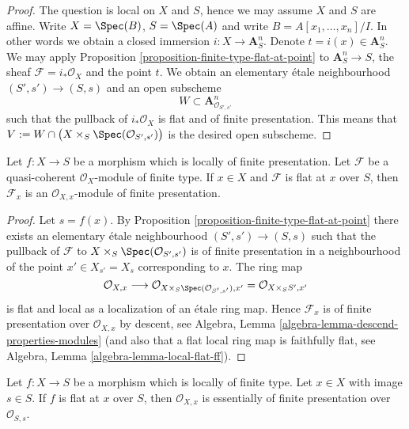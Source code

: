 \begin{proof}
The question is local on $X$ and $S$, hence we may assume $X$ and $S$
are affine. Write $X = \Spec(B)$, $S = \Spec(A)$ and write
$B = A[x_1, \ldots, x_n]/I$. In other words we obtain a closed immersion
$i : X \to \mathbf{A}^n_S$. Denote $t = i(x) \in \mathbf{A}^n_S$.
We may apply
Proposition \ref{proposition-finite-type-flat-at-point}
to $\mathbf{A}^n_S \to S$, the sheaf $\mathcal{F} = i_*\mathcal{O}_X$
and the point $t$. We obtain an elementary
\'etale neighbourhood $(S', s') \to (S, s)$ and an open subscheme
$$
W \subset \mathbf{A}^n_{\mathcal{O}_{S', s'}}
$$
such that the pullback of $i_*\mathcal{O}_X$ is flat and of finite
presentation. This means that
$V := W \cap \big(X \times_S \Spec(\mathcal{O}_{S', s'})\big)$
is the desired open subscheme.
\end{proof}

\begin{lemma}
\label{lemma-finite-type-flat-at-point-local}
Let $f : X \to S$ be a morphism which is locally of finite presentation.
Let $\mathcal{F}$ be a quasi-coherent $\mathcal{O}_X$-module of finite type.
If $x \in X$ and $\mathcal{F}$ is flat at $x$ over $S$, then
$\mathcal{F}_x$ is an $\mathcal{O}_{X, x}$-module of finite presentation.
\end{lemma}

\begin{proof}
Let $s = f(x)$. By
Proposition \ref{proposition-finite-type-flat-at-point}
there exists an elementary \'etale neighbourhood $(S', s') \to (S, s)$
such that the pullback of $\mathcal{F}$ to
$X \times_S \Spec(\mathcal{O}_{S', s'})$ is of
finite presentation in a neighbourhood of the point $x' \in X_{s'} = X_s$
corresponding to $x$. The ring map
$$
\mathcal{O}_{X, x} \longrightarrow
\mathcal{O}_{X \times_S \Spec(\mathcal{O}_{S', s'}), x'}
=
\mathcal{O}_{X \times_S S', x'}
$$
is flat and local as a localization of an \'etale ring map. Hence
$\mathcal{F}_x$ is of finite presentation over $\mathcal{O}_{X, x}$
by descent, see
Algebra, Lemma \ref{algebra-lemma-descend-properties-modules}
(and also that a flat local ring map is faithfully flat, see
Algebra, Lemma \ref{algebra-lemma-local-flat-ff}).
\end{proof}

\begin{lemma}
\label{lemma-finite-type-flat-at-point-local-X}
Let $f : X \to S$ be a morphism which is locally of finite type.
Let $x \in X$ with image $s \in S$. If $f$ is flat at $x$ over $S$, then
$\mathcal{O}_{X, x}$ is essentially of finite presentation over
$\mathcal{O}_{S, s}$.
\end{lemma}

